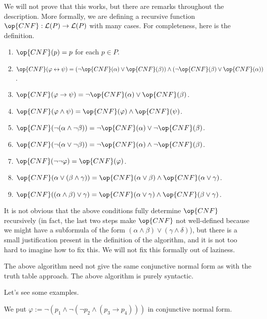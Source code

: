 We will not prove that this works, but there are remarks throughout the description. More formally, we are defining a recursive function $\op{CNF}:\mathcal L(P)\to\mathcal L(P)$ with many cases. For completeness, here is the definition.
\begin{enumerate}
	\item $\op{CNF}(p)=p$ for each $p\in P$.
	\item $\op{CNF}(\varphi\leftrightarrow\psi)=(\lnot\op{CNF}(\alpha)\lor\op{CNF}(\beta))\land(\lnot\op{CNF}(\beta)\lor\op{CNF}(\alpha))$.
	\item $\op{CNF}(\varphi\to\psi)=\lnot\op{CNF}(\alpha)\lor\op{CNF}(\beta)$.
	\item $\op{CNF}(\varphi\land\psi)=\op{CNF}(\varphi)\land\op{CNF}(\psi)$.
	\item $\op{CNF}(\lnot(\alpha\land\lnot\beta))=\lnot\op{CNF}(\alpha)\lor\lnot\op{CNF}(\beta)$.
	\item $\op{CNF}(\lnot(\alpha\lor\lnot\beta))=\lnot\op{CNF}(\alpha)\land\lnot\op{CNF}(\beta)$.
	\item $\op{CNF}(\lnot\lnot\varphi)=\op{CNF}(\varphi)$.
	\item $\op{CNF}(\alpha\lor(\beta\land\gamma))=\op{CNF}(\alpha\lor\beta)\land\op{CNF}(\alpha\lor\gamma)$.
	\item $\op{CNF}((\alpha\land\beta)\lor\gamma)=\op{CNF}(\alpha\lor\gamma)\land\op{CNF}(\beta\lor\gamma)$.
\end{enumerate}
It is not obvious that the above conditions fully determine $\op{CNF}$ recursively (in fact, the last two steps make $\op{CNF}$ not well-defined because we might have a subformula of the form $(\alpha\land\beta)\lor(\gamma\land\delta)$), but there is a small justification present in the definition of the algorithm, and it is not too hard to imagine how to fix this. We will not fix this formally out of laziness.
\begin{remark}
	The above algorithm need not give the same conjunctive normal form as with the truth table approach. The above algorithm is purely syntactic.
\end{remark}
Let's see some examples.
\begin{exe}
	We put $\varphi:=\lnot(p_1\land\lnot(\lnot p_2\land(p_3\to p_4)))$ in conjunctive normal form.
\end{exe}

